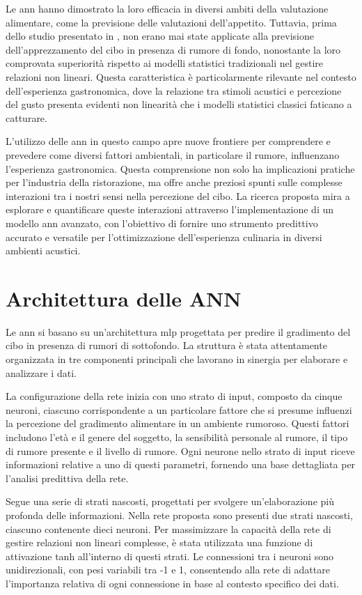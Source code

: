 Le \gls{ann} hanno dimostrato la loro efficacia in diversi ambiti della valutazione alimentare, come la previsione delle valutazioni dell'appetito. Tuttavia, prima dello studio presentato in \cite{alamir2021enhanced}, non erano mai state applicate alla previsione dell'apprezzamento del cibo in presenza di rumore di fondo, nonostante la loro comprovata superiorità rispetto ai modelli statistici tradizionali nel gestire relazioni non lineari. Questa caratteristica è particolarmente rilevante nel contesto dell'esperienza gastronomica, dove la relazione tra stimoli acustici e percezione del gusto presenta evidenti non linearità che i modelli statistici classici faticano a catturare.

L'utilizzo delle \gls{ann} in questo campo apre nuove frontiere per comprendere e prevedere come diversi fattori ambientali, in particolare il rumore, influenzano l'esperienza gastronomica. Questa comprensione non solo ha implicazioni pratiche per l'industria della ristorazione, ma offre anche preziosi spunti sulle complesse interazioni tra i nostri sensi nella percezione del cibo. La ricerca proposta mira a esplorare e quantificare queste interazioni attraverso l'implementazione di un modello \gls{ann} avanzato, con l'obiettivo di fornire uno strumento predittivo accurato e versatile per l'ottimizzazione dell'esperienza culinaria in diversi ambienti acustici.

\section{Architettura delle ANN}
\noindent

Le \gls{ann} si basano su un'architettura \gls{mlp} progettata per predire il gradimento del cibo in presenza di rumori di sottofondo. La struttura è stata attentamente organizzata in tre componenti principali che lavorano in sinergia per elaborare e analizzare i dati.

La configurazione della rete inizia con uno strato di input, composto da cinque neuroni, ciascuno corrispondente a un particolare fattore che si presume influenzi la percezione del gradimento alimentare in un ambiente rumoroso. Questi fattori includono l'età e il genere del soggetto, la sensibilità personale al rumore, il tipo di rumore presente e il livello di rumore. Ogni neurone nello strato di input riceve informazioni relative a uno di questi parametri, fornendo una base dettagliata per l'analisi predittiva della rete.
    
Segue una serie di strati nascosti, progettati per svolgere un'elaborazione più profonda delle informazioni. Nella rete proposta sono presenti due strati nascosti, ciascuno contenente dieci neuroni. Per massimizzare la capacità della rete di gestire relazioni non lineari complesse, è stata utilizzata una funzione di attivazione \gls{tanh} all'interno di questi strati. Le connessioni tra i neuroni sono unidirezionali, con pesi variabili tra -1 e 1, consentendo alla rete di adattare l'importanza relativa di ogni connessione in base al contesto specifico dei dati.

